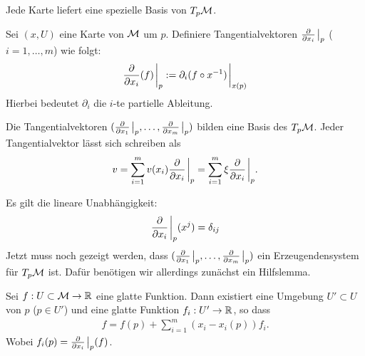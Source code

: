 Jede Karte liefert eine spezielle Basis von $T_p \mathcal{M}$.

\begin{defs}
Sei $(x, U)$ eine Karte von $\mathcal{M}$ um $p$. 
Definiere Tangentialvektoren $\pdv{x_i} \eval_{p} $ ($i = 1, \dots, m$) wie folgt:
\begin{align}
\pdv{x_i}(f)\eval_{p}:= \partial_i (f \circ x^{-1}) \eval_{x(p)}
\end{align}
Hierbei bedeutet $\partial_i$ die $i$-te partielle Ableitung.
\end{defs}

\begin{satz}
\label{satz:BasisTPM}
Die Tangentialvektoren $(\pdv{x_1}\eval_{p}, \dots, \pdv{x_m}\eval_{p})$ bilden eine Basis des $T_{p} \mathcal{M}$.
Jeder Tangentialvektor lässt sich schreiben als
\begin{align}
v = \sum_{i=1}^{m} v(x_i) \pdv{x_i}\eval_{p} = \sum_{i=1}^{m} \xi \pdv{x_i}\eval_{p}.
\end{align}
\end{satz}
\begin{bew}
Es gilt die lineare Unabhängigkeit:
\begin{align}
\pdv{x_i}\eval_{p} (x^j) = \delta_{i j}
\end{align}
Jetzt muss noch gezeigt werden, dass $(\pdv{x_1}\eval_{p}, \dots, \pdv{x_m}\eval_{p})$ ein Erzeugendensystem für $T_{p} \mathcal{M}$ ist.
 Dafür benötigen wir allerdings zunächst ein Hilfslemma.
\end{bew}

\begin{hlem}
\label{hlem:DarstellungBasisTPM}
Sei $f: U \subset \mathcal{M} \to \mathbb{R}$ eine glatte Funktion.
Dann existiert eine Umgebung $U' \subset U$ von $p$ ($p \in U'$) und eine glatte Funktion
$f_i: U' \to \mathbb{R}$, so dass
\begin{align}
f = f(p) + \sum_{i=1}^{m} ( x_i  - x_i(p)) f_i.
\end{align}
Wobei $f_i (p) = \pdv{x_i}\eval_{p} (f)$.
\end{hlem}

